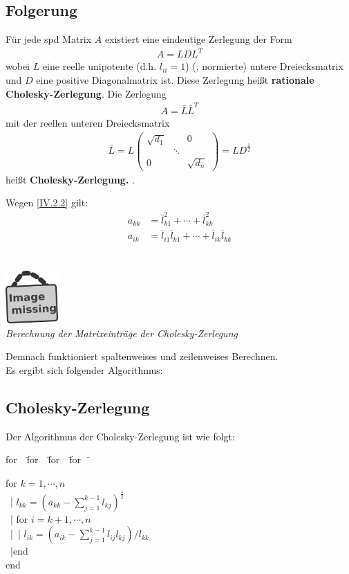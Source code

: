 \documentclass[ngerman,fontsize=11pt, paper=a4, parskip=half, titlepage=true, toc=bib]{scrbook}
\newenvironment{pseudocode}[1]{ %
  \begin{minipage}{#1}
    \begin{framed}
      \hspace*{1em}	
      \begin{minipage}{#1}
        \begin{tabbing}
          for~~\= for~~\= for~~\= for~~\= \kill
	}
	{ %
        \end{tabbing}
      \end{minipage}
      \hspace*{1em}
    \end{framed}
  \end{minipage}
}
\newcommand{\imagemissing}[1]{
  \begin{center}~\\
    \centering 
    \includegraphics[width=2cm]{images/image_missing.jpg}\\
    \textit{#1} \\
  \end{center}
}
\begin{document}
  \subsection{Folgerung} \label{4.2.2}
  Für jede spd Matrix $A$ existiert eine eindeutige Zerlegung der Form 
  \begin{gather*}
    A= LDL^T
  \end{gather*}
  wobei $L$ eine reelle unipotente (d.h. $l_{ii}=1$)  (, normierte)  untere 
  Dreiecksmatrix  und $D$ eine positive Diagonalmatrix ist. 
  Diese Zerlegung heißt \textbf{rationale Cholesky-Zerlegung}. Die Zerlegung
  \begin{gather}
    A= \bar{L}\bar{L}^T 
    \label{IV.2.2}
  \end{gather}
  mit der reellen unteren Dreiecksmatrix
  \begin{gather*}
    \bar{L} = L \begin{pmatrix}
      \sqrt{d_1} &&0 \\
      & \ddots & \\
      0&& \sqrt{d_n}
    \end{pmatrix} = LD^{\frac{1}{2}}
  \end{gather*}
  heißt \textbf{Cholesky-Zerlegung.} .
  
  Wegen \eqref{IV.2.2} gilt: 
  \begin{align}
    a_{kk} &= \bar{l}_{k1}^{2} + \cdots +  \bar{l}_{kk}^2  \label{IV.2.3} \\
    a_{ik} &= \bar{l}_{i1} \bar{l}_{k1} + \cdots + \bar{l}_{ik} \bar{l}_{kk}  \label{IV.2.4} \\
  \end{align}
  \imagemissing{Berechnung der Matrixeinträge der Cholesky-Zerlegung}
  Demnach funktioniert spaltenweises und zeilenweises Berechnen. \\
  
  Es ergibt sich folgender Algorithmus:
  
  
  \subsection{Cholesky-Zerlegung}
  Der Algorithmus der Cholesky-Zerlegung ist wie folgt:
  
  \begin{pseudocode}{0.55\linewidth}
    for  $k=1, \cdots , n$\\
    ~|\> $l_{kk} = (a_{kk}-\sum_{j=1}^{k-1}l_{kj})^{\frac{1}{2}}$ \\
    ~|\> for $i= k+1, \cdots , n$ \\
    ~|\>~|\> $l_{ik} = ( a_{ik}- \sum_{j=1}^{k-1}l_{ij} l_{kj})/{l_{kk}}$  \\
    ~|\>end\\
    end
  \end{pseudocode}
  
\end{document}
